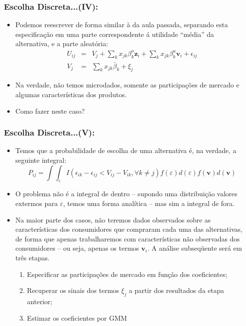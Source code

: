 \documentclass{beamer}
\begin{document}
\begin{frame}\frametitle{Escolha Discreta...(IV):}

\begin{itemize}
\item Podemos reescrever de forma similar à da aula passada, separando esta
especificação em uma parte correspondente á utilidade ``média''
da alternativa, e a parte aleatória:
\begin{eqnarray*}
U_{ij} & = & V_{j}+\sum_{k}x_{jk}\beta_{k}^{o}\mathbf{z}_{i}+\sum_{k}x_{jk}\beta_{k}^{u}\mathbf{v}_{i}+\epsilon_{ij}\\
V_{j} & = & \sum_{k}x_{jk}\bar{\beta}_{k}+\xi_{j}
\end{eqnarray*}
\item Na verdade, não temos microdados, somente as participações de mercado
e algumas características dos produtos.
\item Como fazer neste caso? 
\end{itemize}
\end{frame}

\begin{frame}\frametitle{Escolha Discreta...(V):}
\small
\begin{itemize}
\item Temos que a probabilidade de escolha de uma alternativa é, na verdade,
a seguinte integral:
\[
P_{ij}=\int\int_{\varepsilon}I(\epsilon_{ik}-\epsilon_{ij}<V_{ij}-V_{ik},\forall k\neq j)f(\varepsilon)d(\varepsilon)f(\mathbf{v})d(\mathbf{v})
\]
\item O problema não é a integral de dentro -- supondo uma distribuição
valores extermos para $\varepsilon$, temos uma forma analítica --
mas sim a integral de fora.
\item Na maior parte dos casos, não teremos dados observados sobre as características
dos consumidores que compraram cada uma das alternativas, de forma
que apenas trabalharemos com características não observadas dos consumidores
-- ou seja, apenas os termos $\mathbf{v}_{i}$. A análise
subseqüente será em três etapas.

\begin{enumerate}
\item Especificar as participações de mercado em função dos coeficientes;
\item Recuperar os sinais dos termos $\xi_{j}$ a partir dos resultados
da etapa anterior;
\item Estimar os coeficientes por GMM
\end{enumerate}
\end{itemize}
\end{frame}
\end{document}
